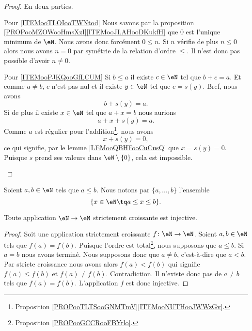 \begin{proof}
	En deux parties.
	\begin{subproof}
		\item[Pour \ref{ITEMooTLOIooTWNtod}]
		Nous savons par la proposition \ref{PROPooMZOWooHmsXzI}\ref{ITEMooJLAHooDKukfH} que \( 0\) est l'unique minimum de \( \eN\). Nous avons donc forcément \( 0\leq n\). Si \( n\) vérifie de plus \( n\leq 0\) alors nous avons \( n=0\) par symétrie de la relation d'ordre \( \leq\). Il n'est donc pas possible d'avoir \( n\neq 0\).
		\item[Pour \ref{ITEMooPJKQooGfLCUM}]
		Si \( b\leq a\) il existe \( c\in \eN\) tel que \( b+c=a\). Et comme \( a\neq b\), \( c\) n'est pas nul et il existe \( y\in \eN\) tel que \( c=s(y)\). Bref, nous avons
		\begin{equation}
			b+s(y)=a.
		\end{equation}
		Si de plus il existe \( x\in \eN\) tel que \( a+x=b\) nous aurions
		\begin{equation}
			a+x+s(y)=a.
		\end{equation}
		Comme \( a\) est régulier pour l'addition\footnote{Proposition \ref{PROPooTLTSooGNMTmV}\ref{ITEMooNUTHooJWWzGv}.}, nous avons
		\begin{equation}
			x+s(y)=0,
		\end{equation}
		ce qui signifie, par le lemme \ref{LEMooQBHFooCuCusQ} que \( x=s(y)=0\). Puisque \( s\) prend ses valeurs dans \( \eN\setminus\{ 0 \}\), cela est impossible.
	\end{subproof}
\end{proof}

\begin{definition}      \label{DEFooKBUFooLvMHrf}
	Soient \( a,b\in \eN\) tels que \( a\leq b\). Nous notons par \( \{ a,\ldots, b \}\) l'ensemble
	\begin{equation}
		\{ x\in \eN\tq a\leq x\leq b \}.
	\end{equation}
\end{definition}

\begin{proposition}     \label{PROPooFYMJooWihvhk}
	Toute application \( \eN\to \eN\) strictement croissante est injective.
\end{proposition}

\begin{proof}
	Soit une application strictement croissante \( f\colon \eN\to \eN\). Soient \( a,b\in \eN\) tels que \( f(a)=f(b)\). Puisque l'ordre est total\footnote{Proposition \ref{PROPooGCCRooFBYrlo}.}, nous supposons que \( a\leq b\). Si \( a=b\) nous avons terminé. Nous supposons donc que \( a\neq b\), c'est-à-dire que \( a<b\). Par stricte croissance nous avons alors \( f(a)<f(b)\) qui signifie \( f(a)\leq f(b)\) et \( f(a)\neq f(b)\). Contradiction. Il n'existe donc pas de \( a\neq b\) tels que \( f(a)=f(b)\). L'application \( f\) est donc injective.
\end{proof}

